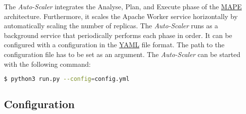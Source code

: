The \textit{Auto-Scaler} integrates the Analyse, Plan, and Execute phase of the \hyperlink{abbr:mape}{MAPE} architecture. Furthermore, it scales the Apache Worker service horizontally by automatically scaling the number of replicas.
The \textit{Auto-Scaler} runs as a background service that periodically performs each phase in order.
It can be configured with a configuration in the \hyperlink{abbr:yaml}{YAML} file format. The path to the configuration file has to be set as an argument.
The \textit{Auto-Scaler} can be started with the following command:
\begin{lstlisting}[label=lst:06_auto-scaler_start, caption=Auto-Scaler start command, language=sh, numbers=none]
$ python3 run.py --config=config.yml
\end{lstlisting}


\subsection{Configuration}
